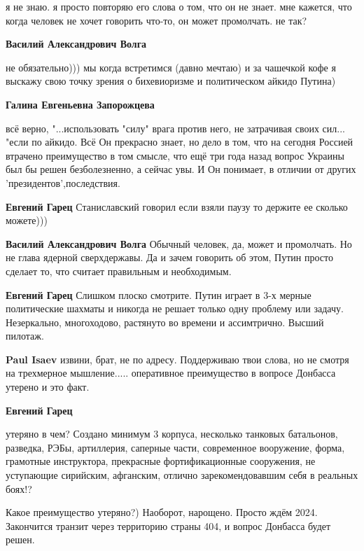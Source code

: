 \begin{itemize}
\begin{itemize} %

я не знаю. я просто повторяю его слова о том, что он не знает. мне кажется, что
когда человек не хочет говорить что-то, он может промолчать. не так?

\textbf{Василий Александрович Волга} 

не обязательно))) мы когда встретимся (давно мечтаю) и за чашечкой кофе я
выскажу свою точку зрения о бихевиоризме и политическом айкидо Путина)


\textbf{Галина Евгеньевна Запорожцева} 

всё верно, "...использовать "силу" врага против него, не затрачивая своих
сил... "если по айкидо. Всё Он прекрасно знает, но дело в том, что на сегодня
Россией втрачено преимущество в том смысле, что ещё три года назад вопрос
Украины был бы решен безболезненно, а сейчас увы. И Он понимает, в отличии от
других 'президентов',последствия.

\textbf{Евгений Гарец} Станиславский говорил если взяли паузу то держите ее сколько можете)))

\textbf{Василий Александрович Волга} Обычный человек, да, может и промолчать. Но не глава ядерной сверхдержавы.
Да и зачем говорить об этом, Путин просто сделает то, что считает правильным и необходимым.

\textbf{Евгений Гарец} Слишком плоско смотрите. Путин играет в 3-х мерные политические шахматы и никогда не решает только одну проблему или задачу. Незеркально, многоходово, растянуто во времени и ассимтрично. Высший пилотаж.

\textbf{Paul Isaev} извини, брат, не по адресу. Поддерживаю твои слова, но не смотря на трехмерное мышление..... оперативное преимущество в вопросе Донбасса утерено и это факт.

\textbf{Евгений Гарец} 

утеряно в чем? Создано минимум 3 корпуса, несколько танковых батальонов,
разведка, РЭБы, артиллерия, саперные части, современное вооружение, форма,
грамотные инструктора, прекрасные фортификационные сооружения, не уступающие
сирийским, афганским, отлично зарекомендовавшим себя в реальных боях!?

Какое преимущество утеряно?) Наоборот, нарощено. Просто ждём 2024. Закончится
транзит через территорию страны 404, и вопрос Донбасса будет решен.


\end{itemize}
\end{itemize}
